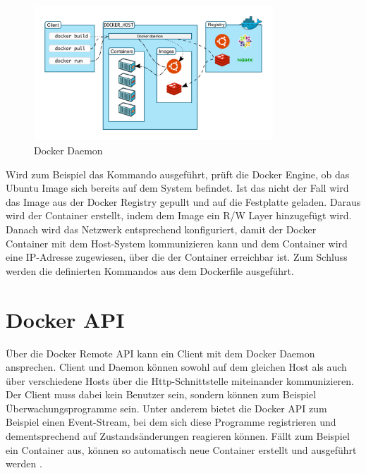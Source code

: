 \begin{figure}[!ht]
  \centering
  \includegraphics[width=0.8\textwidth]{images/12-docker-daemon.png}
  \caption{Docker Daemon\cite{docker:ud}}
\end{figure}

\noindent Wird zum Beispiel das Kommando  ausgeführt, prüft die Docker Engine, ob das Ubuntu Image sich bereits auf dem System befindet. Ist das nicht der Fall wird das Image aus der Docker Registry gepullt und auf die Festplatte geladen. Daraus wird der Container erstellt, indem dem Image ein R/W Layer hinzugefügt wird. Danach wird das Netzwerk entsprechend konfiguriert, damit der Docker Container mit dem Host-System kommunizieren kann und dem Container wird eine IP-Adresse zugewiesen, über die der Container erreichbar ist. Zum Schluss werden die definierten Kommandos aus dem Dockerfile ausgeführt.


\section{Docker API}
Über die Docker Remote API kann ein Client mit dem Docker Daemon ansprechen. Client und Daemon können sowohl auf dem gleichen Host als auch über verschiedene Hosts über die Http-Schnittstelle miteinander kommunizieren. Der Client muss dabei kein Benutzer sein, sondern können zum Beispiel Überwachungsprogramme sein. Unter anderem bietet die Docker API zum Beispiel einen Event-Stream, bei dem sich diese Programme registrieren und dementsprechend auf Zustandsänderungen reagieren können. Fällt zum Beispiel ein Container aus, können so automatisch neue Container erstellt und ausgeführt werden \cite{docker:api}.\\


